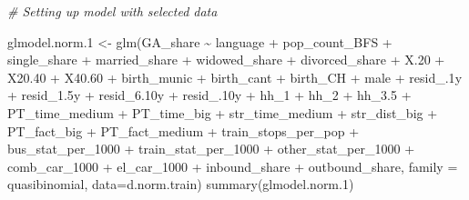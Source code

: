 \documentclass[
]{article}
\newenvironment{Shaded}{\begin{snugshade}}{\end{snugshade}}
\newcommand{\AttributeTok}[1]{\textcolor[rgb]{0.77,0.63,0.00}{#1}}
\newcommand{\CommentTok}[1]{\textcolor[rgb]{0.56,0.35,0.01}{\textit{#1}}}
\newcommand{\FloatTok}[1]{\textcolor[rgb]{0.00,0.00,0.81}{#1}}
\newcommand{\FunctionTok}[1]{\textcolor[rgb]{0.00,0.00,0.00}{#1}}
\newcommand{\NormalTok}[1]{#1}
\newcommand{\OtherTok}[1]{\textcolor[rgb]{0.56,0.35,0.01}{#1}}
\newcommand{\SpecialCharTok}[1]{\textcolor[rgb]{0.00,0.00,0.00}{#1}}
\begin{document}
\begin{Shaded}
\begin{Highlighting}[]
\CommentTok{\# Setting up model with selected data}

\NormalTok{glmodel.norm}\FloatTok{.1} \OtherTok{\textless{}{-}} \FunctionTok{glm}\NormalTok{(GA\_share }\SpecialCharTok{\textasciitilde{}}\NormalTok{ language }\SpecialCharTok{+}\NormalTok{ pop\_count\_BFS }\SpecialCharTok{+}\NormalTok{ single\_share }\SpecialCharTok{+} 
\NormalTok{    married\_share }\SpecialCharTok{+}\NormalTok{ widowed\_share }\SpecialCharTok{+}\NormalTok{ divorced\_share }\SpecialCharTok{+}\NormalTok{ X}\FloatTok{.20} \SpecialCharTok{+}\NormalTok{ X20}\FloatTok{.40} \SpecialCharTok{+} 
\NormalTok{    X40}\FloatTok{.60} \SpecialCharTok{+}\NormalTok{ birth\_munic }\SpecialCharTok{+}\NormalTok{ birth\_cant }\SpecialCharTok{+}\NormalTok{ birth\_CH }\SpecialCharTok{+}\NormalTok{ male }\SpecialCharTok{+}\NormalTok{ resid\_}\FloatTok{.1}\NormalTok{y }\SpecialCharTok{+} 
\NormalTok{    resid\_1}\FloatTok{.5}\NormalTok{y }\SpecialCharTok{+}\NormalTok{ resid\_6}\FloatTok{.10}\NormalTok{y }\SpecialCharTok{+}\NormalTok{ resid\_}\FloatTok{.10}\NormalTok{y }\SpecialCharTok{+}\NormalTok{ hh\_1 }\SpecialCharTok{+}\NormalTok{ hh\_2 }\SpecialCharTok{+}\NormalTok{ hh\_3}\FloatTok{.5} \SpecialCharTok{+} 
\NormalTok{    PT\_time\_medium }\SpecialCharTok{+}\NormalTok{ PT\_time\_big }\SpecialCharTok{+}\NormalTok{ str\_time\_medium }\SpecialCharTok{+}\NormalTok{ str\_dist\_big }\SpecialCharTok{+} 
\NormalTok{    PT\_fact\_big }\SpecialCharTok{+}\NormalTok{ PT\_fact\_medium }\SpecialCharTok{+}\NormalTok{ train\_stops\_per\_pop }\SpecialCharTok{+}\NormalTok{ bus\_stat\_per\_1000 }\SpecialCharTok{+} 
\NormalTok{    train\_stat\_per\_1000 }\SpecialCharTok{+}\NormalTok{ other\_stat\_per\_1000 }\SpecialCharTok{+}\NormalTok{ comb\_car\_1000 }\SpecialCharTok{+} 
\NormalTok{    el\_car\_1000 }\SpecialCharTok{+}\NormalTok{ inbound\_share }\SpecialCharTok{+}\NormalTok{ outbound\_share, }
    \AttributeTok{family =}\NormalTok{ quasibinomial, }\AttributeTok{data=}\NormalTok{d.norm.train)}
\FunctionTok{summary}\NormalTok{(glmodel.norm}\FloatTok{.1}\NormalTok{)}
\end{Highlighting}
\end{Shaded}
\end{document}

